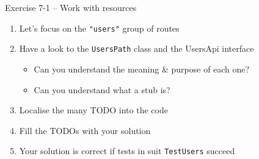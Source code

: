 \documentclass[presentation]{beamer}\mode<presentation>{\usetheme{AMSCesenaPurpleAndGold}}
\begin{document}
\begin{frame}{Exercise 7-1 -- Work with resources}
    \begin{enumerate}
        \item Let's focus on the \texttt{"users"} group of routes
        
        \vfill
        
        \item Have a look to the \texttt{UsersPath} class and the \alert{UsersApi} interface
        \begin{itemize}
            \item Can you understand the meaning \& purpose of each one?
            \item Can you understand what a \alert{stub} is?
        \end{itemize}
        
        \vfill
        
        \item Localise the many TODO into the code
        
        \vfill
        
        \item Fill the TODOs with your solution
        
        \vfill
        
        \item Your solution is correct if tests in suit \texttt{TestUsers} succeed
        
    \end{enumerate}
\end{frame}
\end{document}
